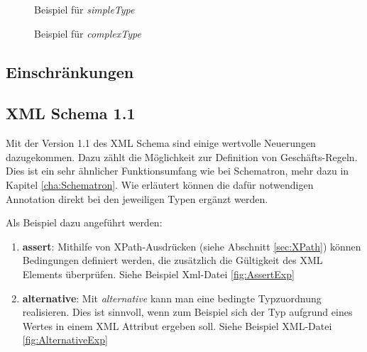 \begin{figure}
\centering
{}
    
\caption{Beispiel für \emph{simpleType}}
\label{fig:simpleTypeExp}
\end{figure}

\begin{figure}
\centering
{}
    
\caption{Beispiel für \emph{complexType}  
}
\label{fig:complexTypeExp}
\end{figure}

\subsection{Einschränkungen}

\subsection{XML Schema 1.1}
Mit der Version 1.1 des XML Schema sind einige wertvolle Neuerungen dazugekommen. Dazu zählt die Möglichkeit zur Definition von Geschäfts-Regeln. Dies ist ein sehr ähnlicher Funktionsumfang wie bei Schematron, mehr dazu in Kapitel  \ref{cha:Schematron}.
Wie \cite{Walmsley} erläutert können die dafür notwendigen Annotation direkt bei den jeweiligen Typen ergänzt werden.

Als Beispiel dazu angeführt werden:
\begin{enumerate}
\item \textbf{assert}: Mithilfe von XPath-Ausdrücken (siehe Abschnitt \ref{sec:XPath}) können Bedingungen definiert werden, die zusätzlich die Gültigkeit des XML Elements überprüfen. Siehe Beispiel Xml-Datei \ref{fig:AssertExp}
\item \textbf{alternative}: Mit \emph{alternative} kann man eine bedingte Typzuordnung realisieren. Dies ist sinnvoll, wenn zum Beispiel sich der Typ aufgrund eines Wertes in einem XML Attribut ergeben soll. Siehe Beispiel XML-Datei \ref{fig:AlternativeExp}
\end{enumerate}

